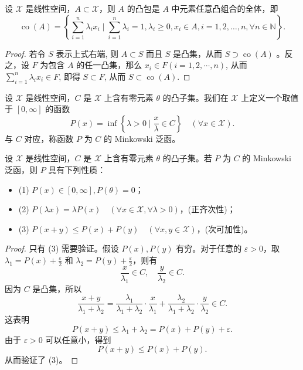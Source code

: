 \documentclass[lang=cn,newtx,10pt,scheme=chinese,thmcnt=chapter]{elegantbook}
\begin{document}
\begin{proposition}
设 $\mathscr{X}$ 是线性空间，$A \subset \mathscr{X}$，则 $A$ 的凸包是 $A$ 中元素任意凸组合的全体，即
\[
\operatorname{co}(A) = \left\{ \sum_{i=1}^n \lambda_i x_i \mid \sum_{i=1}^n \lambda_i = 1, \lambda_i \geqslant 0, x_i \in A, i=1, 2, \dots, n, \forall n \in \mathbb{N} \right\} .
\]
\end{proposition}
\begin{proof}
 若令 $S$ 表示上式右端, 则 $A \subset S$ 而且 $S$ 是凸集，从而 $S \supset \operatorname{co}(A)$ 。反之，设 $F$ 为包含 $A$ 的任一凸集，那么 $x_i \in F(i=1,2, \cdots, n)$, 从而 $\sum_{i=1}^n \lambda_i x_i \in F$, 即得 $S \subset F$, 从而 $S \subset \operatorname{co}(A)$.
\end{proof}
\begin{definition}
设 $\mathscr{X}$ 是线性空间，$C$ 是 $\mathscr{X}$ 上含有零元素 $\theta$ 的凸子集。我们在 $\mathscr{X}$ 上定义一个取值于 $[0, \infty]$ 的函数
\[
P(x) = \inf \left\{ \lambda > 0 \mid \frac{x}{\lambda} \in C \right\} \quad (\forall x \in \mathscr{X}).
\]
与 $C$ 对应，称函数 $P$ 为 $C$ 的 Minkowski 泛函。
\end{definition}

\begin{proposition}
设 $\mathscr{X}$ 是线性空间，$C$ 是 $\mathscr{X}$ 上含有零元素 $\theta$ 的凸子集。若 $P$ 为 $C$ 的 Minkowski 泛函，则 $P$ 具有下列性质：
\begin{itemize}
    \item (1) $P(x) \in [0, \infty], P(\theta) = 0$；
    \item (2) $P(\lambda x) = \lambda P(x) \quad (\forall x \in \mathscr{X}, \forall \lambda > 0)$，(正齐次性)；
    \item (3) $P(x + y) \leqslant P(x) + P(y) \quad (\forall x, y \in \mathscr{X})$，(次可加性)。
\end{itemize}
\end{proposition}

\begin{proof}
只有 (3) 需要验证。假设 $P(x), P(y)$ 有穷。对于任意的 $\varepsilon > 0$，取 $\lambda_1 = P(x) + \frac{\varepsilon}{2}$ 和 $\lambda_2 = P(y) + \frac{\varepsilon}{2}$，则有
\[
\frac{x}{\lambda_1} \in C, \quad \frac{y}{\lambda_2} \in C.
\]
因为 $C$ 是凸集，所以
\[
\frac{x + y}{\lambda_1 + \lambda_2} = \frac{\lambda_1}{\lambda_1 + \lambda_2} \cdot \frac{x}{\lambda_1} + \frac{\lambda_2}{\lambda_1 + \lambda_2} \cdot \frac{y}{\lambda_2} \in C.
\]
这表明
\[
P(x + y) \leqslant \lambda_1 + \lambda_2 = P(x) + P(y) + \varepsilon.
\]
由于 $\varepsilon > 0$ 可以任意小，得到
\[
P(x + y) \leqslant P(x) + P(y).
\]
从而验证了 (3)。
\end{proof}
\end{document}
